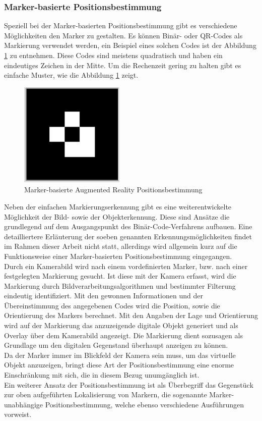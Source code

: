 \subsubsection*{Marker-basierte Positionsbestimmung}
Speziell bei der Marker-basierten Positionsbestimmung gibt es verschiedene Möglichkeiten den Marker zu gestalten. Es können 
Binär- oder QR-Codes als Markierung verwendet werden, ein Beispiel eines solchen Codes ist der Abbildung \ref{pic:markerARpos} zu entnehmen. 
Diese Codes sind meistens quadratisch und haben ein eindeutiges Zeichen in der Mitte. Um die Rechenzeit gering zu halten gibt es einfache Muster, 
wie die Abbildung \ref{pic:markerARpos} zeigt.
\begin{figure}[hbt!]
    \centering
    \includegraphics[width=5cm,height=5cm,keepaspectratio]{2Grundlagen/Bilder/bildmarkerAR.png}
    \caption{Marker-basierte Augmented Reality Positionsbestimmung}
    \label{pic:markerARpos}
\end{figure}
Neben der einfachen Markierungserkennung gibt es eine weiterentwickelte Möglichkeit der Bild- sowie der Objekterkennung. Diese sind Ansätze 
die grundlegend auf dem Ausgangspunkt des Binär-Code-Verfahrens aufbauen. Eine detailliertere Erläuterung der soeben genannten 
Erkennungsmöglichkeiten findet im Rahmen dieser Arbeit nicht statt, allerdings wird allgemein kurz auf die Funktionsweise einer 
Marker-basierten Positionsbestimmung eingegangen.
\\ 
Durch ein Kamerabild wird nach einem vordefinierten Marker, bzw. nach einer festgelegten Markierung gesucht. Ist diese mit der Kamera erfasst, 
wird die Markierung durch Bildverarbeitungsalgorithmen und bestimmter Filterung eindeutig identifiziert. Mit den gewonnen Informationen und 
der Übereinstimmung des angegebenen Codes wird die Position, sowie die Orientierung des Markers berechnet. Mit den Angaben der Lage und 
Orientierung wird auf der Markierung das anzuzeigende digitale Objekt generiert und als Overlay über dem Kamerabild angezeigt. Die Markierung 
dient sozusagen als Grundlage um den digitalen Gegenstand überhaupt anzeigen zu können.
\\ 
Da der Marker immer im Blickfeld der Kamera sein muss, um das virtuelle Objekt anzuzeigen, bringt diese Art der Positionsbestimmung eine 
enorme Einschränkung mit sich, die in diesem Bezug unumgänglich ist. 
\\ 
\linebreak
Ein weiterer Ansatz der Positionsbestimmung ist als Überbegriff das Gegenstück zur oben aufgeführten Lokalisierung von Markern, die 
sogenannte Marker-unabhängige Positionsbestimmung, welche ebenso verschiedene Ausführungen vorweist. 
